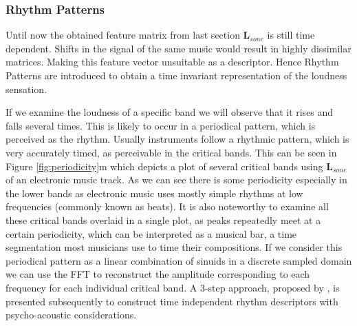 \documentclass[cic,tc,english]{iiufrgs}
\begin{document}
\subsubsection{Rhythm Patterns}
Until now the obtained feature matrix from last section $\bm{L}_{sone}$ is still time dependent. Shifts in the signal of the same music would result in highly dissimilar matrices. Making this feature vector unsuitable as a descriptor. Hence Rhythm Patterns are introduced to obtain a time invariant representation of the loudness sensation.

If we examine the loudness of a specific band we will observe that it rises and falls several times. This is likely to occur in a periodical pattern, which is perceived as the rhythm. Usually instruments follow a rhythmic pattern, which is very accurately timed, as perceivable in the critical bands. This can be seen in Figure \ref{fig:periodicity}m which depicts a plot of several critical bands using $\bm{L}_{sone}$ of an electronic music track. As we can see there is some periodicity especially in the lower bands as electronic music uses mostly simple rhythms at low frequencies (commonly known as beats). It is also noteworthy to examine all these critical bands overlaid in a single plot, as peaks repeatedly meet at a certain periodicity, which can be interpreted as a musical bar, a time segmentation most musicians use to time their compositions. If we consider this periodical pattern as a linear combination of sinuids in a discrete sampled domain we can use the FFT to reconstruct the amplitude corresponding to each frequency for each individual critical band. A 3-step approach, proposed by \cite{rauber2002using}, is presented subsequently to construct time independent rhythm descriptors with psycho-acoustic considerations.
\end{document}
